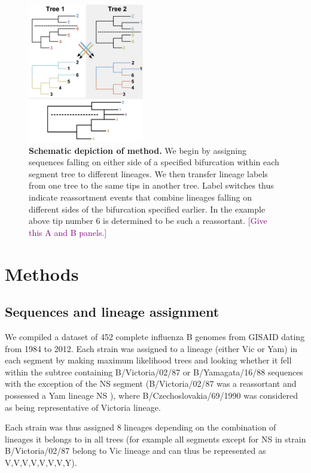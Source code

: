 \documentclass[11pt,oneside,letterpaper]{article}
\def\tbc#1{\textcolor{purple}{[#1]}}
\begin{document}
\begin{figure}[h]
 \centering		
	\includegraphics[width=0.45\textwidth]{figures/TreeFigure2}
	\caption{\textbf{Schematic depiction of method.}
We begin by assigning sequences falling on either side of a specified bifurcation within each segment tree to different lineages.
We then transfer lineage labels from one tree to the same tips in another tree.
Label switches thus indicate reassortment events that combine lineages falling on different sides of the bifurcation specified earlier.
In the example above tip number 6 is determined to be such a reassortant. \tbc{Give this A and B panels.}}
	\label{methodFig}
\end{figure}

\section*{Methods}

\subsection*{Sequences and lineage assignment}

We compiled a dataset of 452 complete influenza B genomes from GISAID \cite{GISAID} dating from 1984 to 2012. 
Each strain was assigned to a lineage (either Vic or Yam) in each segment by making maximum likelihood trees and looking whether it fell within the subtree containing B/Victoria/02/87 or B/Yamagata/16/88 sequences with the exception of the NS segment (B/Victoria/02/87 was a reassortant and possessed a Yam lineage NS \cite{lindstrom1999}), where B/Czechoslovakia/69/1990 was considered as being representative of Victoria lineage.

Each strain was thus assigned 8 lineages depending on the combination of lineages it belongs to in all trees (for example all segments except for NS in strain B/Victoria/02/87 belong to Vic lineage and can thus be represented as V,V,V,V,V,V,V,Y). 
\end{document}
